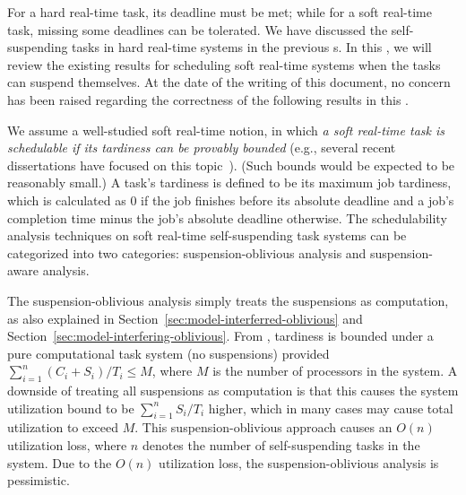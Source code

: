 \label{sec:soft-realtime}

For a hard real-time task, its deadline must be met; while for a soft real-time task, missing some deadlines can be tolerated. We have discussed the self-suspending tasks in hard real-time systems in the previous \mysectionrefnormal{}s. In this \mysectionrefnormal{}, we will review the existing results for scheduling soft real-time systems when the tasks can suspend themselves. At the date of the writing of this
document, no concern has been raised regarding the correctness of the following results in this \mysectionrefnormal{}. 


 We assume a well-studied soft real-time notion, in which \emph{a soft real-time task is schedulable if its tardiness can be provably bounded} (e.g., several recent dissertations have focused on this topic~\cite{leontyev2010compositional, devi2006soft}). (Such bounds would be expected to be reasonably small.) A task's tardiness is defined to be its maximum job tardiness, which is calculated as $0$ if the job finishes before its absolute deadline and a job's completion time minus the job's absolute deadline otherwise. 
The schedulability analysis techniques on soft real-time self-suspending task systems can be categorized into two categories: suspension-oblivious analysis and suspension-aware analysis.

\label{sec:sus-oblivious-soft}

 The suspension-oblivious analysis simply treats the suspensions as computation, as also explained in Section~\ref{sec:model-interferred-oblivious} and Section~\ref{sec:model-interfering-oblivious}. From \cite{Devi2005,Leontyev072}, tardiness is bounded under a pure computational task system (no suspensions) provided $\sum_{i=1}^{n} (C_i+S_i)/T_i \leq M$, where $M$ is the number of processors in the system. A downside of treating all suspensions as computation is that this causes the system utilization bound to be $\sum_{i=1}^{n} S_i/T_i$ higher, which in many cases may cause total utilization to exceed $M$.  This suspension-oblivious approach causes an $O(n)$ utilization loss, where $n$ denotes the number of self-suspending tasks in the system. 
 Due to the $O(n)$ utilization loss, the suspension-oblivious analysis is pessimistic. 

\label{sec:sus-aware-soft}

